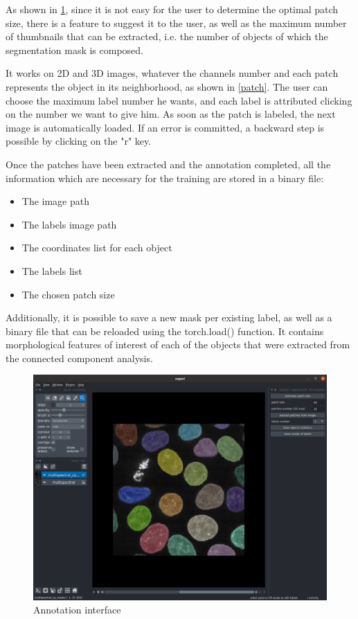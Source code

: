 \documentclass{article}
\begin{document}
As shown in \ref{labelization}, since it is not easy for the user to determine the optimal patch size, there is a feature to suggest it to the user, as well as the maximum number of thumbnails that can be extracted, i.e. the number of objects of which the segmentation mask is composed. 

It works on 2D and 3D images, whatever the channels number and each patch represents the object in its neighborhood, as shown in \ref{patch}. The user can choose the maximum label number he wants, and each label is attributed clicking on the number we want to give him. As soon as the patch is labeled, the next image is automatically loaded. If an error is committed, a backward step is possible by clicking on the "r" key.

Once the patches have been extracted and the annotation completed, all the information which are necessary for the training are stored in a binary file:
\begin{itemize}
  \item The image path 
  \item The labels image path
  \item The coordinates list for each object
  \item The labels list
  \item The chosen patch size  
\end{itemize}
Additionally, it is possible to save a new mask per existing label, as well as a binary file that can be reloaded using the torch.load() function. It contains morphological features of interest of each of the objects that were extracted from the connected component analysis.


\begin{figure}[htp!]
 \centering
 \includegraphics[scale=0.18]{Figures/annotations.png}
  \caption{Annotation interface}
  \label{labelization}

\end{figure}
\end{document}
